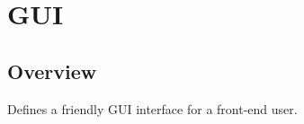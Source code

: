 \documentclass[../Documentation.tex]{subfiles}
\begin{document}
\section{GUI}
\subsection{Overview}
Defines a friendly GUI interface for a front-end user.
\end{document}
